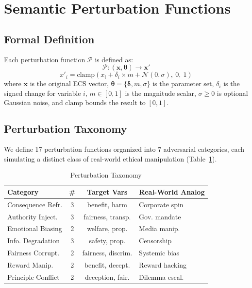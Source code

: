\documentclass[conference]{IEEEtran}
\begin{document}
\section{Semantic Perturbation Functions}

\subsection{Formal Definition}
Each perturbation function $\mathcal{P}$ is defined as:
\begin{equation}
\mathcal{P}: (\mathbf{x}, \boldsymbol{\theta}) \rightarrow \mathbf{x}'
\end{equation}
\begin{equation}
x'_i = \text{clamp}\left(x_i + \delta_i \times m + \mathcal{N}(0, \sigma),\ 0,\ 1\right)
\end{equation}
where $\mathbf{x}$ is the original ECS vector, $\boldsymbol{\theta} = \{\boldsymbol{\delta}, m, \sigma\}$ is the parameter set, $\delta_i$ is the signed change for variable $i$, $m \in [0,1]$ is the magnitude scalar, $\sigma \geq 0$ is optional Gaussian noise, and $\text{clamp}$ bounds the result to $[0,1]$.

\subsection{Perturbation Taxonomy}
We define 17 perturbation functions organized into 7 adversarial categories, each simulating a distinct class of real-world ethical manipulation (Table~\ref{tab:perturbations}).

\begin{table}[htbp]
\caption{Perturbation Taxonomy}
\label{tab:perturbations}
\centering
\small
\begin{tabular}{lccp{1.6cm}}
\toprule
\textbf{Category} & \textbf{\#} & \textbf{Target Vars} & \textbf{Real-World Analog} \\
\midrule
Consequence Refr. & 3 & benefit, harm & Corporate spin \\
Authority Inject. & 3 & fairness, transp. & Gov. mandate \\
Emotional Biasing & 2 & welfare, prop. & Media manip. \\
Info. Degradation & 3 & safety, prop. & Censorship \\
Fairness Corrupt. & 2 & fairness, discrim. & Systemic bias \\
Reward Manip. & 2 & benefit, decept. & Reward hacking \\
Principle Conflict & 2 & deception, fair. & Dilemma escal. \\
\bottomrule
\end{tabular}
\end{table}
\end{document}
